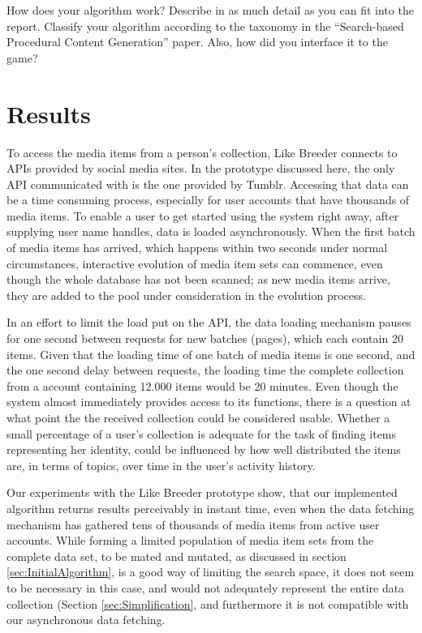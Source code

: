 \documentclass[]{article}
\begin{document}
\begin{framed}
How does your algorithm work? Describe in as much detail as you can fit into the report. Classify your algorithm according to the taxonomy in the “Search-based Procedural Content Generation” paper. Also, how did you interface it to the game?
\end{framed}

\section{Results}
\label{sec:Results}

To access the media items from a person's collection, Like Breeder connects to APIs provided by social media sites.  In the prototype discussed here, the only API communicated with is the one provided by Tumblr.  Accessing that data can be a time consuming process, especially for user accounts that have thousands of media items.  To enable a user to get started using the system right away, after supplying user name handles, data is loaded asynchronously.  When the first batch of media items has arrived, which happens within two seconds under normal circumstances, interactive evolution of media item sets can commence, even though the whole database has not been scanned; as new media items arrive, they are added to the pool under consideration in the evolution process.  

In an effort to limit the load put on the API, the data loading mechanism pauses for one second between requests for new batches (pages), which each contain 20 items.  Given that the loading time of one batch of media items is one second, and the one second delay between requests, the loading time the complete collection from a account containing 12.000 items would be 20 minutes.  Even though the system almost immediately provides access to its functions, there is a question at what point the the received collection could be considered usable.  Whether a small percentage of a user's collection is adequate for the task of finding items representing her identity, could be influenced by how well distributed the items are, in terms of topics, over time in the user's activity history.

Our experiments with the Like Breeder prototype show, that our implemented algorithm returns results perceivably in instant time, even when the data fetching mechanism has gathered tens of thousands of media items from active user accounts.  While forming a limited population of media item sets from the complete data set, to be mated and mutated, as discussed in section \ref{sec:InitialAlgorithm}, is a good way of limiting the search space, it does not seem to be necessary in this case, and would not adequately represent the entire data collection (Section \ref{sec:Simplification}, and furthermore it is not compatible with our asynchronous data fetching.
\end{document}
